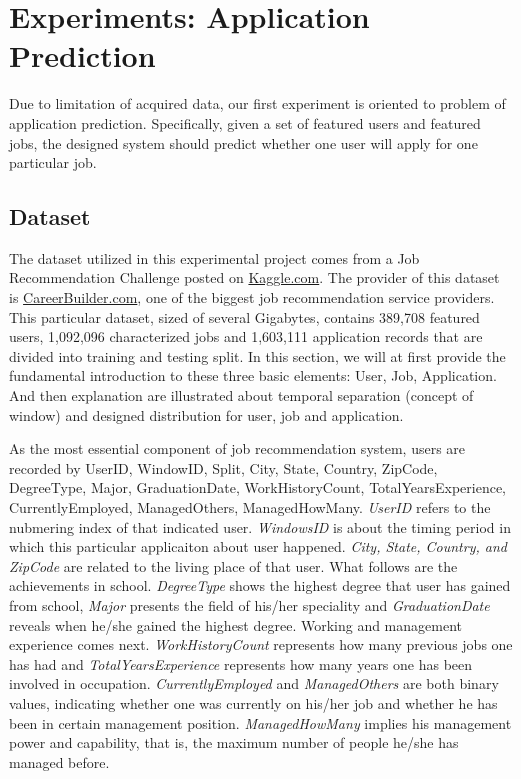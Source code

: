 \documentclass{article} %
\begin{document}
\section{Experiments: Application Prediction}
Due to limitation of acquired data, our first experiment is oriented to
problem of application prediction. Specifically, given a set of featured users
and featured jobs, the designed system should predict whether one user will
apply for one particular job.

\subsection{Dataset}
The dataset utilized in this experimental project comes from a Job
Recommendation Challenge posted on
\href{http://www.kaggle.com/c/job-recommendation/data}{Kaggle.com}. The
provider of this dataset is
\href{http://www.careerbuilder.com/}{CareerBuilder.com}, one of the biggest
job recommendation service providers. This particular dataset, sized of several
Gigabytes, contains 389,708 featured users, 1,092,096
characterized jobs and 1,603,111 application records that are divided into
training and testing split.  In this section, we will at first provide the
fundamental introduction to these three basic elements: User, Job,
Application. And then explanation are illustrated about temporal separation (concept of
window) and designed distribution for user, job and application. 

As the most essential component of job recommendation system, users are
recorded by UserID, WindowID, Split, City, State, Country, ZipCode,
DegreeType, Major, GraduationDate, WorkHistoryCount,
TotalYearsExperience, CurrentlyEmployed, ManagedOthers, ManagedHowMany.
{\it UserID} refers to the nubmering index of that indicated user.  
{\it WindowsID} is about the timing period in which this particular
applicaiton about user happened. 
{\it City, State, Country, and ZipCode} are related to the living place of
that user. 
What follows are the achievements in school. 
{\it DegreeType} shows the highest degree that user has gained from school,
{\it Major} presents the field of his/her speciality and 
{\it GraduationDate} reveals when he/she gained the highest degree.
Working and management experience comes next.
{\it WorkHistoryCount} represents how many previous jobs one has had and
{\it TotalYearsExperience} represents how many years one has been involved in
occupation. 
{\it CurrentlyEmployed} and {\it ManagedOthers} are both binary values,
indicating whether one was currently on his/her job and whether he has been in
certain management position. 
{\it ManagedHowMany} implies his management power and capability, that is, the maximum number
of people he/she has managed before.
\end{document}
